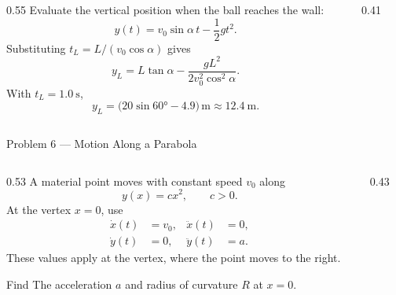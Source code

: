 \begin{solutionframe}
  \begin{columns}[T,onlytextwidth]
    \begin{column}{0.55\textwidth}
      Evaluate the vertical position when the ball reaches the wall:
      \[
        y(t)=v_0\sin\alpha\,t-\frac12gt^2.
      \]
      Substituting $t_L=L/(v_0\cos\alpha)$ gives
      \[
        y_L=L\tan\alpha-\frac{gL^2}{2v_0^2\cos^2\alpha}.
      \]
      With $t_L=\SI{1.0}{\second}$,
      \[
        y_L=\bigl(20\sin\ang{60}-4.9\bigr)\,\si{\metre}
          \approx\SI{12.4}{\metre}.
      \]
    \end{column}
    \begin{column}{0.41\textwidth}
      \centering
      \resizebox{\linewidth}{!}{}
    \end{column}
  \end{columns}
\end{solutionframe}

\begin{frame}{Problem 6 — Motion Along a Parabola}
  \begin{columns}[T,onlytextwidth]
    \begin{column}{0.53\textwidth}
      \small
      A material point moves with constant speed $v_0$ along
      \[
        y(x)=cx^2,\qquad c>0.
      \]
      At the vertex $x=0$, use
      \[
        \begin{aligned}
          \dot x(t)&=v_0, & \ddot x(t)&=0,\\
          \dot y(t)&=0,   & \ddot y(t)&=a.
        \end{aligned}
      \]
      These values apply at the vertex, where the point moves to the right.
      \begin{block}{Find}
        The acceleration $a$ and radius of curvature $R$ at $x=0$.
      \end{block}
    \end{column}
    \begin{column}{0.43\textwidth}
      \centering
      \resizebox{!}{0.46\paperheight}{}
    \end{column}
  \end{columns}
\end{frame}

